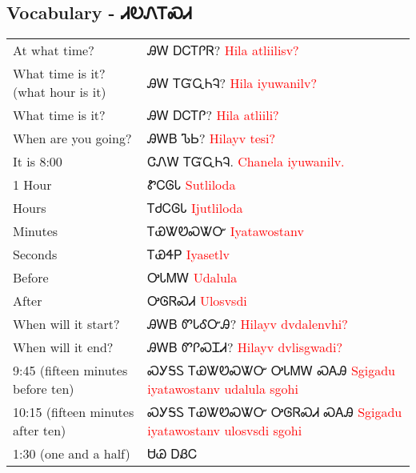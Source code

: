 {{{{{{\subsection{Vocabulary - ᏗᎧᏁᎢᏍᏗ 
}
\begin{tabular}{p{3cm} p{11cm}}
At what time? & ᎯᎳ ᎠᏟᎢᎵᏒ? 
 \newline \textcolor{red}{Hila atliilisv?}\\
What time is it? (what hour is it) & ᎯᎳ ᎢᏳᏩᏂᎸ? 
 \newline \textcolor{red}{Hila iyuwanilv?}\\
What time is it? & ᎯᎳ ᎠᏟᎢᎵ? 
 \newline \textcolor{red}{Hila atliili?}\\
When are you going? & ᎯᎳᏴ ᏖᏏ? 
 \newline \textcolor{red}{Hilayv tesi?}\\
It is 8:00 & ᏣᏁᎳ ᎢᏳᏩᏂᎸ. 
 \newline \textcolor{red}{Chanela iyuwanilv.}\\
1 Hour & ᏑᏟᎶᏓ 
 \newline \textcolor{red}{Sutliloda}\\
Hours & ᎢᏧᏟᎶᏓ 
 \newline \textcolor{red}{Ijutliloda}\\
Minutes & ᎢᏯᏔᏬᏍᏔᏅ 
 \newline \textcolor{red}{Iyatawostanv}\\
Seconds & ᎢᏯᏎᏢ 
 \newline \textcolor{red}{Iyasetlv}\\
Before & ᎤᏓᎷᎳ 
 \newline \textcolor{red}{Udalula}\\
After & ᎤᎶᏒᏍᏗ 
 \newline \textcolor{red}{Ulosvsdi}\\
When will it start? & ᎯᎳᏴ ᏛᏓᎴᏅᎯ? 
 \newline \textcolor{red}{Hilayv dvdalenvhi?}\\
When will it end? & ᎯᎳᏴ ᏛᎵᏍᏆᏗ? 
 \newline \textcolor{red}{Hilayv dvlisgwadi?}\\
9:45 (fifteen minutes before ten) & ᏍᎩᎦᏚ ᎢᏯᏔᏬᏍᏔᏅ ᎤᏓᎷᎳ ᏍᎪᎯ 
 \newline \textcolor{red}{Sgigadu iyatawostanv udalula sgohi}\\
10:15 (fifteen minutes after ten) & ᏍᎩᎦᏚ ᎢᏯᏔᏬᏍᏔᏅ ᎤᎶᏒᏍᏗ ᏍᎪᎯ 
 \newline \textcolor{red}{Sgigadu iyatawostanv ulosvsdi sgohi}\\
1:30 (one and a half) & ᏌᏊ ᎠᏰᏟ 

\end{tabular}}}}}}}
